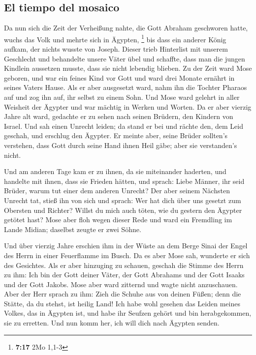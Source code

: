 \hypertarget{el-tiempo-del-mosaico}{%
\subsection{El tiempo del mosaico}\label{el-tiempo-del-mosaico}}

 Da nun sich die Zeit der Verheißung nahte, die Gott
Abraham geschworen hatte, wuchs das Volk und mehrte sich in Ägypten,
\footnote{\textbf{7:17} 2Mo 1,1-3}  bis dass ein anderer
König aufkam, der nichts wusste von Joseph.  Dieser trieb
Hinterlist mit unserem Geschlecht und behandelte unsere Väter übel und
schaffte, dass man die jungen Kindlein aussetzen musste, dass sie nicht
lebendig blieben.  Zu der Zeit ward Mose geboren, und war
ein feines Kind vor Gott und ward drei Monate ernährt in seines Vaters
Hause.  Als er aber ausgesetzt ward, nahm ihn die Tochter
Pharaos auf und zog ihn auf, ihr selbst zu einem Sohn. 
Und Mose ward gelehrt in aller Weisheit der Ägypter und war mächtig in
Werken und Worten.  Da er aber vierzig Jahre alt ward,
gedachte er zu sehen nach seinen Brüdern, den Kindern von Israel.
 Und sah einen Unrecht leiden; da stand er bei und rächte
den, dem Leid geschah, und erschlug den Ägypter.  Er
meinte aber, seine Brüder sollten's verstehen, dass Gott durch seine
Hand ihnen Heil gäbe; aber sie verstanden's nicht.

 Und am anderen Tage kam er zu ihnen, da sie miteinander
haderten, und handelte mit ihnen, dass sie Frieden hätten, und sprach:
Liebe Männer, ihr seid Brüder, warum tut einer dem anderen Unrecht?
 Der aber seinem Nächsten Unrecht tat, stieß ihn von sich
und sprach: Wer hat dich über uns gesetzt zum Obersten und Richter?
 Willst du mich auch töten, wie du gestern den Ägypter
getötet hast?  Mose aber floh wegen dieser Rede und ward
ein Fremdling im Lande Midian; daselbst zeugte er zwei Söhne.

 Und über vierzig Jahre erschien ihm in der Wüste an dem
Berge Sinai der Engel des Herrn in einer Feuerflamme im Busch.
 Da es aber Mose sah, wunderte er sich des Gesichtes. Als
er aber hinzuging zu schauen, geschah die Stimme des Herrn zu ihm:
 Ich bin der Gott deiner Väter, der Gott Abrahams und der
Gott Isaaks und der Gott Jakobs. Mose aber ward zitternd und wagte nicht
anzuschauen.  Aber der Herr sprach zu ihm: Zieh die
Schuhe aus von deinen Füßen; denn die Stätte, da du stehst, ist heilig
Land!  Ich habe wohl gesehen das Leiden meines Volkes,
das in Ägypten ist, und habe ihr Seufzen gehört und bin herabgekommen,
sie zu erretten. Und nun komm her, ich will dich nach Ägypten senden.

